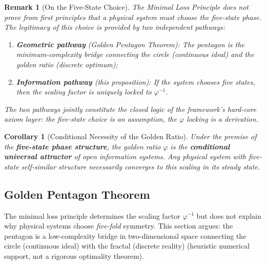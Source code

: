 \documentclass[12pt,a4paper,twocolumn]{article}
\renewcommand{\phi}{\varphi}
\newtheorem{corollary}[theorem]{Corollary}
\newtheorem{remark}[theorem]{Remark}
\begin{document}
\begin{remark}[On the Five-State Choice]
The Minimal Loss Principle does \emph{not} prove from first principles that a physical system \emph{must} choose the five-state phase. The legitimacy of this choice is provided by two independent pathways:
\begin{enumerate}
\item \textbf{Geometric pathway} (Golden Pentagon Theorem): The pentagon is the minimum-complexity bridge connecting the circle (continuous ideal) and the golden ratio (discrete optimum);
\item \textbf{Information pathway} (this proposition): If the system chooses five states, then the scaling factor is uniquely locked to $\phi^{-1}$.
\end{enumerate}
The two pathways jointly constitute the closed logic of the framework's hard-core axiom layer: the five-state choice is an \emph{assumption}, the $\phi$ locking is a \emph{derivation}.
\end{remark}

\begin{corollary}[Conditional Necessity of the Golden Ratio]
Under the premise of the \textbf{five-state phase structure}, the golden ratio $\phi$ is the \textbf{conditional universal attractor} of open information systems. Any physical system with five-state self-similar structure necessarily converges to this scaling in its steady state.
\end{corollary}

\subsection{Golden Pentagon Theorem}
\label{subsec:pentagon}

The minimal loss principle determines the scaling factor $\phi^{-1}$ but does not explain why physical systems choose \textit{five-fold} symmetry. This section argues: the pentagon is a low-complexity bridge in two-dimensional space connecting the circle (continuous ideal) with the fractal (discrete reality) (heuristic numerical support, not a rigorous optimality theorem).
\end{document}
